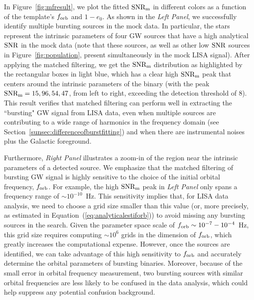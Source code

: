 \documentclass[%
 reprint,
 amsmath,amssymb,
 aps,
]{revtex4-2}
\begin{document}
In Figure~\ref{fig:mfresult}, we plot the fitted $\rm SNR_m$ in different colors as a function of the template's $f_{\rm orb}$ and $1-e_0$. As shown in the {\it Left Panel}, we successfully identify multiple bursting sources in the mock data. In particular, the stars represent the intrinsic parameters of four GW sources that have a high analytical $\rm SNR$ in the mock data (note that these sources, as well as other low $\rm SNR$ sources in Figure~\ref{fig:population}, present simultaneously in the mock LISA signal). After applying the matched filtering, we get the $\rm SNR_m$ distribution as highlighted by the rectangular boxes in light blue, which has a clear high $\rm SNR_m$ peak that centers around the intrinsic parameters of the binary (with the peak $\rm SNR_m=15,96,54,47$, from left to right, exceeding the detection threshold of 8). This result verifies that matched filtering can perform well in extracting the ``bursting" GW signal from LISA data, even when multiple sources are contributing to a wide range of harmonics in the frequency domain (see Section~\ref{sunsec:differenceofburstfitting}) and when there are instrumental noises plus the Galactic foreground.

Furthermore, {\it Right Panel} illustrates a zoom-in of the region near the intrinsic parameters of a detected source. We emphasize that the matched filtering of bursting GW signal is highly sensitive to the choice of the initial orbital frequency, $f_{\rm orb}$. For example, the high $\rm SNR_m$ peak in {\it Left Panel} only spans a frequency range of $\sim 10^{-10}$~Hz. This sensitivity implies that, for LISA data analysis, we need to choose a grid size smaller than this value (or, more precisely, as estimated in Equation~(\ref{eq:analyticalestiforb})) to avoid missing any bursting sources in the search. Given the parameter space scale of $f_{\rm orb}\sim 10^{-7}-10^{-4}$~Hz, this grid size requires computing $\sim 10^6$ grids in the dimension of $f_{\rm orb}$, which greatly increases the computational expense. However, once the sources are identified, we can take advantage of this high sensitivity to $f_{\rm orb}$ and accurately determine the orbital parameters of bursting binaries. Moreover, because of the small error in orbital frequency measurement, two bursting sources with similar orbital frequencies are less likely to be confused in the data analysis, which could help suppress any potential confusion background.
\end{document}
